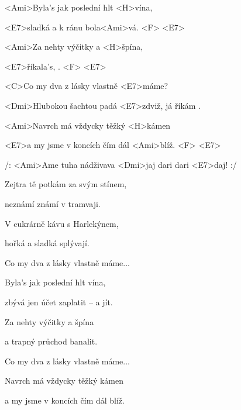 

\zs
<Ami>Byla's jak poslední hlt <H>vína,

<E7>sladká a k ránu bola<Ami>vá. <F> <E7>

<Ami>Za nehty výčitky a <H>špína,

<E7>říkala's, . <F> <E7>
\ks

\zr
<C>Co my dva z lásky vlastně <E7>máme?

<Dmi>Hlubokou šachtou padá <E7>zdviž, já říkám .

<Ami>Navrch má vždycky těžký <H>kámen

<E7>a my jsme v koncích čím dál <Ami>blíž. <F> <E7>

/: <Ami>Ame tuha nádživava <Dmi>jaj dari dari <E7>daj! :/
\kr

\zs
Zejtra tě potkám za svým stínem,

neznámí známí v tramvaji.

V cukrárně kávu s Harlekýnem,

hořká a sladká splývají.
\ks

\zr
Co my dva z lásky vlastně máme...
\kr

\zs
Byla's jak poslední hlt vína,

zbývá jen účet zaplatit – a jít.

Za nehty výčitky a špína

a trapný průchod banalit.
\ks

\zr
Co my dva z lásky vlastně máme...

Navrch má vždycky těžký kámen

a my jsme v koncích čím dál blíž.
\kr

\kp
